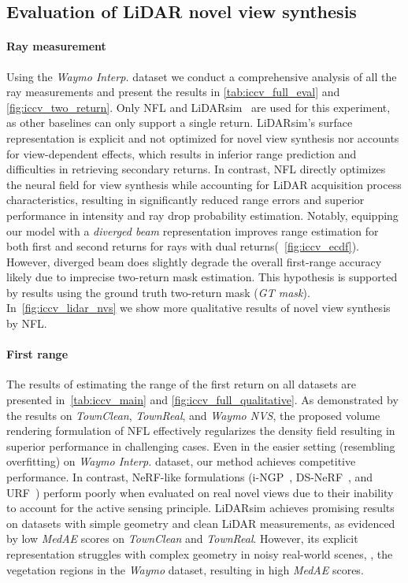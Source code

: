 \subsection{Evaluation of LiDAR novel view synthesis}
\label{sec:lidar_nvs_eval}

\paragraph{Ray measurement}
Using the \emph{Waymo Interp.} dataset we conduct a comprehensive analysis of all the ray measurements and present the results in \cref{tab:iccv_full_eval} and \cref{fig:iccv_two_return}. Only NFL and LiDARsim~\cite{manivasagam2020lidarsim} are used for this experiment, as other baselines can only support a single return. 
LiDARsim's surface representation is explicit and not optimized for novel view synthesis nor accounts for view-dependent effects, which results in inferior range prediction and difficulties in retrieving secondary returns. In contrast, NFL directly optimizes the neural field for view synthesis while accounting for LiDAR acquisition process characteristics, resulting in significantly reduced range errors and superior performance in intensity and ray drop probability estimation. Notably, equipping our model with a \textit{diverged beam} representation improves range estimation for both first and second returns for rays with dual returns(\cf ~\cref{fig:iccv_ecdf}). However, diverged beam does slightly degrade the overall first-range accuracy likely due to imprecise two-return mask estimation. This hypothesis is supported by results using the ground truth two-return mask (\textit{GT mask}). In~\cref{fig:iccv_lidar_nvs} we show more qualitative results of novel view synthesis by NFL.


\paragraph{First range}
The results of estimating the range of the first return on all datasets are presented in~\cref{tab:iccv_main} and \cref{fig:iccv_full_qualitative}. As demonstrated by the results on \textit{TownClean}, \textit{TownReal}, and \textit{Waymo NVS}, the proposed volume rendering formulation of NFL effectively regularizes the density field resulting in superior performance in challenging cases. Even in the easier setting (resembling overfitting) on \textit{Waymo Interp.} dataset, our method achieves competitive performance. In contrast, NeRF-like formulations (i-NGP~\cite{mueller2022instant}, DS-NeRF~\cite{deng2021depth}, and URF~\cite{rematas2021urban}) perform poorly when evaluated on real novel views due to their inability to account for the active sensing principle. LiDARsim achieves promising results on datasets with simple geometry and clean LiDAR measurements, as evidenced by low \textit{MedAE} scores on \textit{TownClean} and \textit{TownReal}. However, its explicit representation struggles with complex geometry in noisy real-world scenes, \eg, the vegetation regions in the \textit{Waymo} dataset, resulting in high \textit{MedAE} scores.


